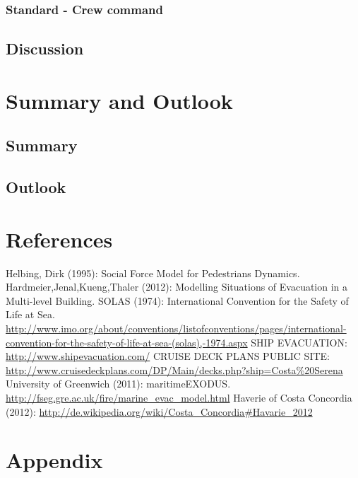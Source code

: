 \documentclass[11pt]{article}
\begin{document}
\subsubsection{Standard - Crew command}
\subsection{Discussion}
\section{Summary and Outlook}
\subsection{Summary}
\subsection{Outlook}
\section{References}

\begin{thebibliography}{9}
 Helbing, Dirk (1995): Social Force Model for Pedestrians Dynamics.
 Hardmeier,Jenal,Kueng,Thaler (2012): Modelling Situations of Evacuation in a Multi-level Building.
 SOLAS (1974): International Convention for the Safety of Life at Sea. \url{http://www.imo.org/about/conventions/listofconventions/pages/international-convention-for-the-safety-of-life-at-sea-(solas),-1974.aspx}
 SHIP EVACUATION: \url{http://www.shipevacuation.com/}
 CRUISE DECK PLANS PUBLIC SITE: \url{http://www.cruisedeckplans.com/DP/Main/decks.php?ship=Costa%20Serena}
 University of Greenwich (2011):  maritimeEXODUS. \url{http://fseg.gre.ac.uk/fire/marine_evac_model.html}
 Haverie of Costa Concordia (2012): \url{http://de.wikipedia.org/wiki/Costa_Concordia#Havarie_2012}
	
\end{thebibliography}
\section{Appendix}
\end{document}
